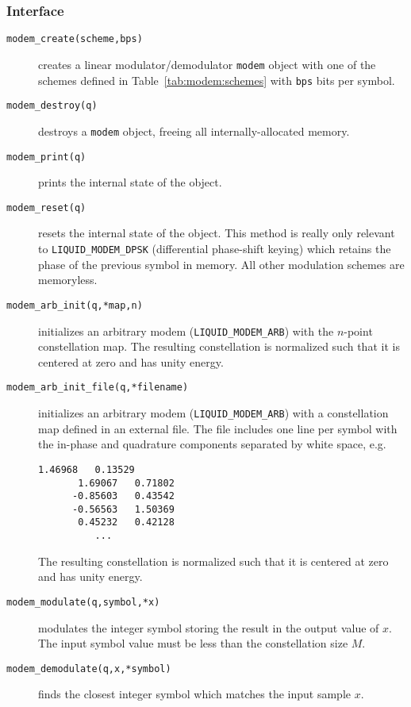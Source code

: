 

\subsubsection{Interface}
\label{module:modem:digital:interface}
\begin{description}
\item[{\tt modem\_create(scheme,bps)}]
    creates a linear modulator/demodulator {\tt modem} object with one
    of the schemes defined in Table~\ref{tab:modem:schemes}
    with {\tt bps} bits per symbol.
\item[{\tt modem\_destroy(q)}]
    destroys a {\tt modem} object, freeing all internally-allocated
    memory.
\item[{\tt modem\_print(q)}]
    prints the internal state of the object.
\item[{\tt modem\_reset(q)}]
    resets the internal state of the object.
    This method is really only relevant to {\tt LIQUID\_MODEM\_DPSK}
    (differential phase-shift keying) which retains the phase of the
    previous symbol in memory.
    All other modulation schemes are memoryless.
\item[{\tt modem\_arb\_init(q,*map,n)}]
    initializes an arbitrary modem ({\tt LIQUID\_MODEM\_ARB}) with the $n$-point
    constellation map.
    The resulting constellation is normalized such that it is centered
    at zero and has unity energy.
\item[{\tt modem\_arb\_init\_file(q,*filename)}]
    initializes an arbitrary modem ({\tt LIQUID\_MODEM\_ARB}) with a constellation
    map defined in an external file.
    The file includes one line per symbol with the in-phase and
    quadrature components separated by white space, e.g.
    \begin{Verbatim}[fontsize=\small]
       1.46968   0.13529
       1.69067   0.71802
      -0.85603   0.43542
      -0.56563   1.50369
       0.45232   0.42128
          ...
    \end{Verbatim}
    The resulting constellation is normalized such that it is centered
    at zero and has unity energy.
\item[{\tt modem\_modulate(q,symbol,*x)}]
    modulates the integer symbol storing the result in the output value
    of $x$.
    The input symbol value must be less than the constellation size $M$.
\item[{\tt modem\_demodulate(q,x,*symbol)}]
    finds the closest integer symbol which matches the input sample $x$.

\end{description}
